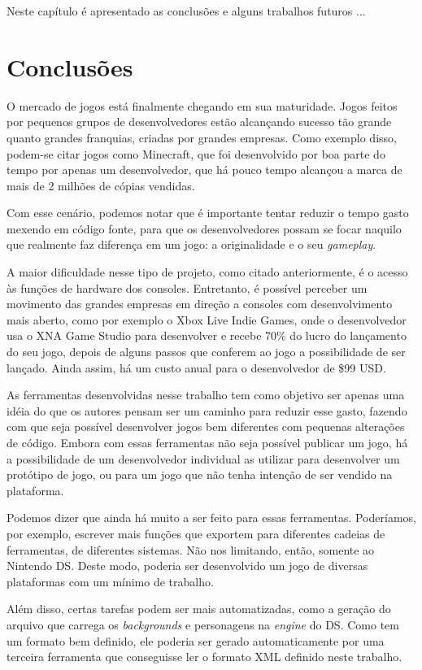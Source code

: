 \documentclass[brazil]{abnt}
\begin{document}
Neste capítulo é apresentado as conclusões e alguns trabalhos futuros
...
\newpage


\section{Conclusões}

O mercado de jogos está finalmente chegando em sua maturidade. Jogos feitos por pequenos grupos de desenvolvedores estão alcançando sucesso tão grande quanto grandes franquias, criadas por grandes empresas. Como exemplo disso, podem-se citar jogos como Minecraft, que foi desenvolvido por boa parte do tempo por apenas um desenvolvedor, que há pouco tempo alcançou a marca de mais de 2 milhões de cópias vendidas. \cite{MinecraftSales}

Com esse cenário, podemos notar que é importante tentar reduzir o tempo gasto mexendo em código fonte, para que os desenvolvedores possam se focar naquilo que realmente faz diferença em um jogo: a originalidade e o seu \textit{gameplay}.

A maior dificuldade nesse tipo de projeto, como citado anteriormente, é o acesso às funções de hardware dos consoles. Entretanto, é possível perceber um movimento das grandes empresas em direção a consoles com desenvolvimento mais aberto, como por exemplo o Xbox Live Indie Games, onde o desenvolvedor usa o XNA Game Studio para desenvolver e recebe 70\% do lucro do lançamento do seu jogo, depois de alguns passos que conferem ao jogo a possibilidade de ser lançado. Ainda assim, há um custo anual para o desenvolvedor de \$99 USD. \cite{XNAAppHub} 

As ferramentas desenvolvidas nesse trabalho tem como objetivo ser apenas uma idéia do que os autores pensam ser um caminho para reduzir esse gasto, fazendo com que seja possível desenvolver jogos bem diferentes com pequenas alterações de código. Embora com essas ferramentas não seja possível publicar um jogo, há a possibilidade de um desenvolvedor individual as utilizar para desenvolver um protótipo de jogo, ou para um jogo que não tenha intenção de ser vendido na plataforma.

Podemos dizer que ainda há muito a ser feito para essas ferramentas. Poderíamos, por exemplo, escrever mais funções que exportem para diferentes cadeias de ferramentas, de diferentes sistemas. Não nos limitando, então, somente ao Nintendo DS. Deste modo, poderia ser desenvolvido um jogo de diversas plataformas com um mínimo de trabalho.

Além disso, certas tarefas podem ser mais automatizadas, como a geração do arquivo que carrega os \textit{backgrounds} e personagens na \textit{engine} do DS. Como tem um formato bem definido, ele poderia ser gerado automaticamente por uma terceira ferramenta que conseguisse ler o formato XML definido neste trabalho.
\end{document}
